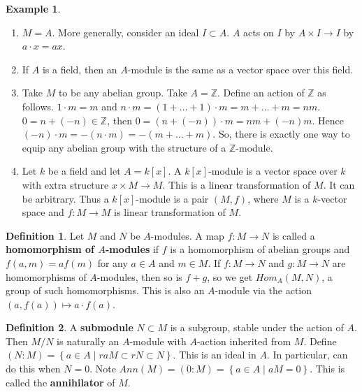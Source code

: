 \documentclass{article}
\newcommand{\Z}{\mathbb{Z}}
\newcommand{\rb}[1]{\left( #1 \right)}
\renewcommand{\sb}[1]{\left[ #1 \right]}
\newcommand{\cb}[1]{\left\{ #1 \right\}}
\theoremstyle{definition}\newtheorem{definition}{Definition}[section]
\theoremstyle{definition}\newtheorem{remark}[definition]{Remark}
\theoremstyle{definition}\newtheorem*{example}{Example}
\theoremstyle{definition}\newtheorem*{note}{Note}
\begin{document}
\begin{example}
\hfill
\begin{enumerate}
\item $ M = A $. More generally, consider an ideal $ I \subset A $. $ A $ acts on $ I $ by $ A \times I \to I $ by $ a \cdot x = ax $.
\item If $ A $ is a field, then an $ A $-module is the same as a vector space over this field.
\item Take $ M $ to be any abelian group. Take $ A = \Z $. Define an action of $ \Z $ as follows. $ 1 \cdot m = m $ and $ n \cdot m = \rb{1 + \dots + 1} \cdot m = m + \dots + m = nm $. $ 0 = n + \rb{- n} \in \Z $, then $ 0 = \rb{n + \rb{-n}} \cdot m = nm + \rb{-n}m $. Hence $ \rb{-n} \cdot m = -\rb{n \cdot m} = -\rb{m + \dots + m} $. So, there is exactly one way to equip any abelian group with the structure of a $ \Z $-module.
\item Let $ k $ be a field and let $ A = k\sb{x} $. A $ k\sb{x} $-module is a vector space over $ k $ with extra structure $ x \times M \to M $. This is a linear transformation of $ M $. It can be arbitrary. Thus a $ k\sb{x} $-module is a pair $ \rb{M, f} $, where $ M $ is a $ k $-vector space and $ f : M \to M $ is linear transformation of $ M $.
\end{enumerate}
\end{example}

\begin{definition}
Let $ M $ and $ N $ be $ A $-modules. A map $ f : M \to N $ is called a \textbf{homomorphism of $ A $-modules} if $ f $ is a homomorphism of abelian groups and $ f\rb{a, m} = af\rb{m} $ for any $ a \in A $ and $ m \in M $. If $ f : M \to N $ and $ g : M \to N $ are homomorphisms of $ A $-modules, then so is $ f + g $, so we get $ Hom_A\rb{M, N} $, a group of such homomorphisms. This is also an $ A $-module via the action $ \rb{a, f\rb{a}} \mapsto a \cdot f\rb{a} $.
\end{definition}

\begin{definition}
A \textbf{submodule} $ N \subset M $ is a subgroup, stable under the action of $ A $. Then $ M / N $ is naturally an $ A $-module with $ A $-action inherited from $ M $. Define $ \rb{N : M} = \cb{a \in A \mid raM \subset rN \subset N} $. This is an ideal in $ A $. In particular, can do this when $ N = 0 $. Note $ Ann\rb{M} = \rb{0 : M} = \cb{a \in A \mid aM = 0} $. This is called the \textbf{annihilator} of $ M $.
\end{definition}
\end{document}
